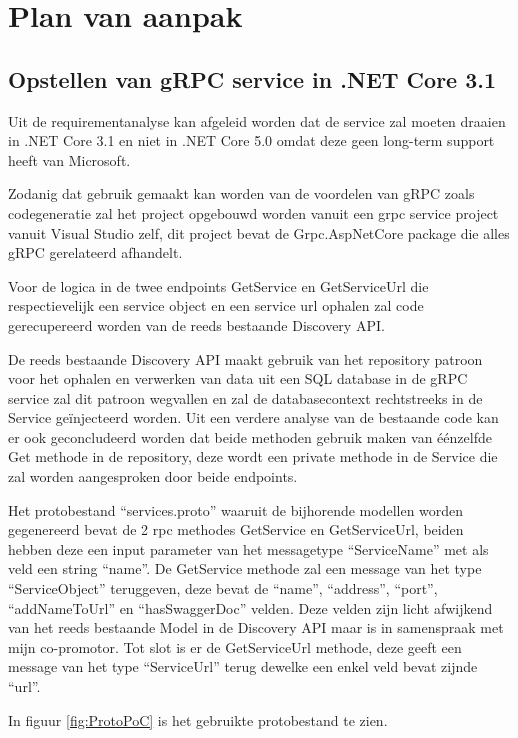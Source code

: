 \section{Plan van aanpak}
\label{sec:Plan van aanpak}

\subsection{Opstellen van gRPC service in .NET Core 3.1 }
\label{subsec:Opstellen van gRPC service in .NET Core 3.1}
Uit de requirementanalyse kan afgeleid worden dat de service zal moeten draaien in .NET Core 3.1 en niet in .NET Core 5.0 omdat deze geen long-term support heeft van Microsoft.

Zodanig dat gebruik gemaakt kan worden van de voordelen van gRPC zoals codegeneratie zal het project opgebouwd worden vanuit een grpc service project vanuit Visual Studio zelf, dit project bevat de Grpc.AspNetCore package die alles gRPC gerelateerd afhandelt.

Voor de logica in de twee endpoints GetService en GetServiceUrl die respectievelijk een service object en een service url ophalen zal code gerecupereerd worden van de reeds bestaande Discovery API.

De reeds bestaande Discovery API maakt gebruik van het repository patroon voor het ophalen en verwerken van data uit een SQL database in de gRPC service zal dit patroon wegvallen en zal de databasecontext rechtstreeks in de Service geïnjecteerd worden. Uit een verdere analyse van de bestaande code kan er ook geconcludeerd worden dat beide methoden gebruik maken van éénzelfde Get methode in de repository, deze wordt een private methode in de Service die zal worden aangesproken door beide endpoints.

Het protobestand “services.proto” waaruit de bijhorende modellen worden gegenereerd bevat de 2 rpc methodes GetService en GetServiceUrl, beiden hebben deze een input parameter van het messagetype “ServiceName” met als veld een string “name”.
De GetService methode zal een message van het type “ServiceObject” teruggeven, deze bevat de “name”, “address”, “port”, “addNameToUrl” en “hasSwaggerDoc” velden. Deze velden zijn licht afwijkend van het reeds bestaande Model in de Discovery API maar is in samenspraak met mijn co-promotor.
Tot slot is er de GetServiceUrl methode, deze geeft een message van het type “ServiceUrl” terug dewelke een enkel veld bevat zijnde “url”.

In figuur \ref{fig:ProtoPoC} is het gebruikte protobestand te zien.

